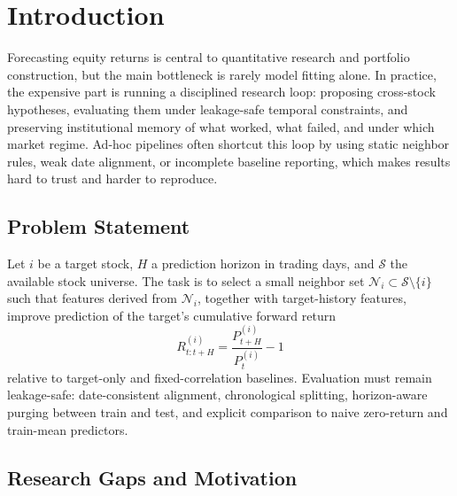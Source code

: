\documentclass[12pt,a4paper,titlepage]{article}
\begin{document}
\begin{abstract}
\vspace{0.5em}

\end{abstract}

\clearpage
\tableofcontents
\clearpage

\listoffigures
{}
\clearpage

\listoftables
{}
\clearpage

\section{Introduction}

Forecasting equity returns is central to quantitative research and portfolio construction, but the main bottleneck is rarely model fitting alone. In practice, the expensive part is running a disciplined research loop: proposing cross-stock hypotheses, evaluating them under leakage-safe temporal constraints, and preserving institutional memory of what worked, what failed, and under which market regime. Ad-hoc pipelines often shortcut this loop by using static neighbor rules, weak date alignment, or incomplete baseline reporting, which makes results hard to trust and harder to reproduce.

\subsection{Problem Statement}

Let \(i\) be a target stock, \(H\) a prediction horizon in trading days, and \(\mathcal{S}\) the available stock universe. The task is to select a small neighbor set \(\mathcal{N}_i \subset \mathcal{S}\setminus\{i\}\) such that features derived from \(\mathcal{N}_i\), together with target-history features, improve prediction of the target's cumulative forward return
\[
R_{t:t+H}^{(i)} = \frac{P_{t+H}^{(i)}}{P_t^{(i)}} - 1
\]
relative to target-only and fixed-correlation baselines. Evaluation must remain leakage-safe: date-consistent alignment, chronological splitting, horizon-aware purging between train and test, and explicit comparison to naive zero-return and train-mean predictors.

\subsection{Research Gaps and Motivation}
\end{document}
